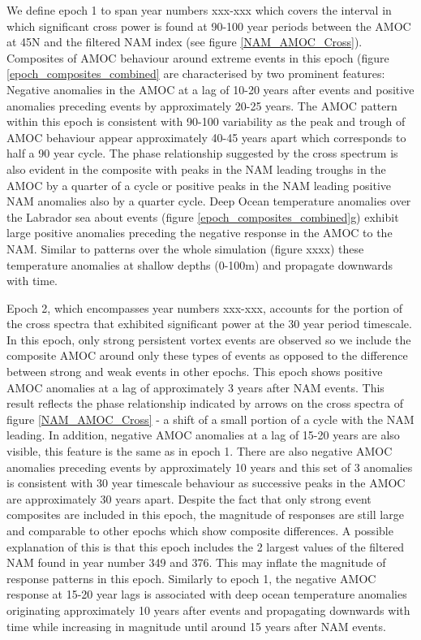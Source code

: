 We define epoch 1 to span year numbers xxx-xxx which covers the interval in which significant cross power is found at 90-100 year periods between the AMOC at 45N and the filtered NAM index (see figure \ref{NAM_AMOC_Cross}). Composites of AMOC behaviour around extreme events in this epoch (figure \ref{epoch_composites_combined} are characterised by two prominent features: Negative anomalies in the AMOC at a lag of 10-20 years after events and positive anomalies preceding events by approximately 20-25 years. The AMOC pattern within this epoch is consistent with 90-100 variability as the peak and trough of AMOC behaviour appear approximately 40-45 years apart which corresponds to half a 90 year cycle. The phase relationship suggested by the cross spectrum is also evident in the composite with peaks in the NAM leading troughs in the AMOC by a quarter of a cycle or positive peaks in the NAM leading positive NAM anomalies also by a quarter cycle. Deep Ocean temperature anomalies over the Labrador sea about events (figure \ref{epoch_composites_combined}g) exhibit large positive anomalies preceding the negative response in the AMOC to the NAM. Similar to patterns over the whole simulation (figure xxxx) these temperature anomalies at shallow depths (0-100m) and propagate downwards with time.

Epoch 2, which encompasses year numbers xxx-xxx, accounts for the portion of the cross spectra that exhibited significant power at the 30 year period timescale. In this epoch, only strong persistent vortex events are observed so we include the composite AMOC around only these types of events as opposed to the difference between strong and weak events in other epochs. This epoch shows positive AMOC anomalies at a lag of approximately 3 years after NAM events. This result reflects the phase relationship indicated by arrows on the cross spectra of figure \ref{NAM_AMOC_Cross} - a shift of a small portion of a cycle with the NAM leading. In addition, negative AMOC anomalies at a lag of 15-20 years are also visible, this feature is the same as in epoch 1. There are also negative AMOC anomalies preceding events by approximately 10 years and this set of 3 anomalies is consistent with 30 year timescale behaviour as successive peaks in the AMOC are approximately 30 years apart. Despite the fact that only strong event composites are included in this epoch, the magnitude of responses are still large and comparable to other epochs which show composite differences. A possible explanation of this is that this epoch includes the 2 largest values of the filtered NAM found in year number 349 and 376. This may inflate the magnitude of response patterns in this epoch. Similarly to epoch 1, the negative AMOC response at 15-20 year lags is associated with deep ocean temperature anomalies originating approximately 10 years after events and propagating downwards with time while increasing in magnitude until around 15 years after NAM events. 

